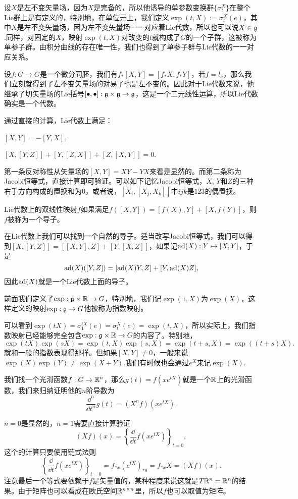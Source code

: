 \para 设$X$是左不变矢量场，因为$X$是完备的，所以他诱导的单参数变换群$\{\sigma^X_t\}$在整个Lie群上是有定义的，特别地，在单位元上，我们定义$\exp(t,X):=\sigma^X_t(e)$，其中$X$是左不变矢量场，因为左不变矢量场一一对应着Lie代数，所以也可以说$X\in {\mathfrak{g}}$.同样，对固定的$X$，映射$\exp(t,X)$对改变的$t$就构成了$G$的一个子群，这被称为单参子群。由积分曲线的存在唯一性，我们也得到了单参子群与Lie代数的一一对应关系。

\pro 设$f:G\to G$是一个微分同胚，我们有$f_*[X,Y]=[f_*X,f_*Y]$，若$f=l_a$，那么我们立刻就得到了左不变矢量场的对易子也是左不变的。因此对于Lie代数来说，他继承了切矢量场的Lie括号$[\bullet,\bullet]:{\mathfrak{g}}\times {\mathfrak{g}}\to {\mathfrak{g}}$，这是一个二元线性运算，所以Lie代数确实是一个代数。

通过直接的计算，Lie代数上满足：

 $[X,Y]=-[Y,X]$,

 $[X,[Y,Z]]+[Y,[Z,X]]+[Z,[X,Y]]=0$.

第一条反对称性从矢量场的$[X,Y]=XY-YX$来看是显然的。而第二条称为Jacobi恒等式，直接计算即可验证。可以如下记忆Jacobi恒等式，$X$, $Y$和$Z$的三种右手方向构成的置换和为$0$，或者说，$[X_i,[X_j,X_k]]$中$ijk$是$123$的偶置换。

\para Lie代数上的双线性映射$f$如果满足$f([X,Y])=[f(X),Y]+[X,f(Y)]$，则$f$被称为一个导子。

在Lie代数上我们可以找到一个自然的导子。适当改写Jacobi恒等式，我们可以得到$[X,[Y,Z]]=[[X,Y],Z]+[Y,[X,Z]]$，如果记$\operatorname{ad}(X):Y\mapsto [X,Y]$，于是
\[
	\operatorname{ad}(X)([Y,Z])=[\operatorname{ad}(X)Y,Z]+[Y,\operatorname{ad}(X)Z],
\]
因此$\operatorname{ad}(X)$就是一个Lie代数上面的导子。

\para 前面我们定义了$\exp:{\mathfrak{g}}\times \mathbb{R}\to G$，特别地，我们记$\exp(1,X)$为$\exp(X)$，这样定义的映射$\exp:{\mathfrak{g}}\to G$他被称为指数映射。

可以看到$\exp(tX)=\sigma^{tX}_1(e)=\sigma^{X}_t(e)=\exp(t,X)$，所以实际上，我们指数映射已经能够完全包含$\exp:{\mathfrak{g}}\times \mathbb{R}\to G$的内容了。特别地，
\[
	\exp(tX)\exp(sX)=\exp(t,X)\exp(s,X)=\exp(t+s,X)=\exp((t+s)X).
\]
就和一般的指数表现得那样。但如果$[X,Y]\neq 0$，一般来说$\exp(X)\exp(Y)\neq \exp(X+Y)$.我们有时候也会通过$e^{X}$来记$\exp(X)$.

\lem \label{exp}我们找一个光滑函数$f:G\to \mathbb{R}^n$，那么$g(t)=f(xe^{tX})$就是一个$\mathbb{R}$上的光滑函数，我们来归纳证明他的$n$阶导数为
\[
	\frac{\dd^n}{\dd t^n}g(t)=(X^nf)(x e^{tX}).
\]

\proof $n=0$是显然的，$n=1$需要直接计算验证
\[
	(Xf)(x)=\left\{\frac{\dd}{\dd t}f(x e^{tX})\right\}_{t=0},
\]
这个的计算只要使用链式法则
\[
	\left\{\frac{\dd}{\dd t}f(x e^{tX})\right\}_{t=0}=f_{*x}(e^{tX})_{*0}=f_{*x}X=(Xf)(x).
\]
注意最后一个等式要依赖于$f$是矢量值的，某种程度来说这就是$T\mathbb{R}^n=\mathbb{R}^n$的结果。由于矩阵也可以看成在欧氏空间$\mathbb{R}^{n\times n}$里，所以$f$也可以取值为矩阵。

